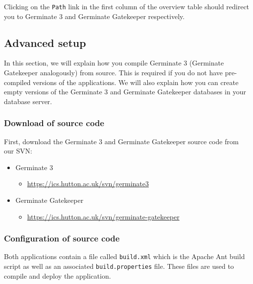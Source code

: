 Clicking on the \texttt{Path} link in the first column of the overview table should redirect you to Germinate 3 and Germinate Gatekeeper respectively.

\subsection{Advanced setup}
In this section, we will explain how you compile Germinate 3 (Germinate Gatekeeper analogously) from source. This is required if you do not have pre-compiled versions of the applications. We will also explain how you can create empty versions of the Germinate 3 and Germinate Gatekeeper databases in your database server.

\subsubsection{Download of source code}

First, download the Germinate 3 and Germinate Gatekeeper source code from our SVN:

\begin{itemize}
	\item Germinate 3
	\begin{itemize}
		\item \url{https://ics.hutton.ac.uk/svn/germinate3}
	\end{itemize}
	\item Germinate Gatekeeper
	\begin{itemize}
		\item \url{https://ics.hutton.ac.uk/svn/germinate-gatekeeper}
	\end{itemize}
\end{itemize}

\subsubsection{Configuration of source code}
\label{sec:germinate-config}
Both applications contain a file called \texttt{build.xml} which is the Apache Ant build script as well as an associated \texttt{build.properties} file. These files are used to compile and deploy the application.

